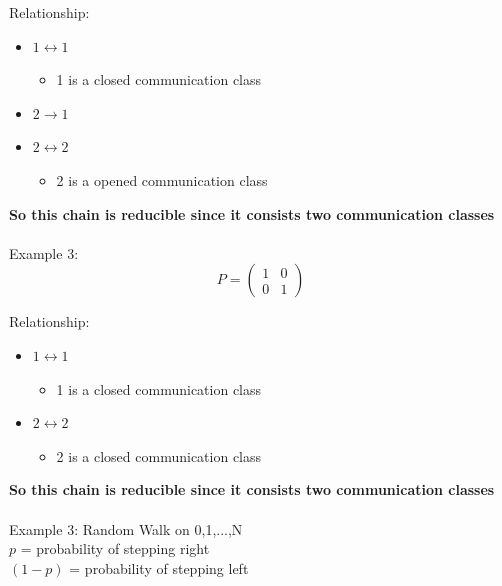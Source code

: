 \documentclass[12pt]{article}
\begin{document}
Relationship:\\
\begin{itemize}
    \item $1 \leftrightarrow1$
        \begin{itemize}
            \item {1} is a closed communication class
        \end{itemize}
    \item $2 \xrightarrow{}1$ 
    \item $2 \leftrightarrow 2$
        \begin{itemize}
            \item {2} is a opened communication class
        \end{itemize}
\end{itemize}
\textbf{So this chain is reducible since it consists two communication classes}\\\\
Example 3:
\[
P = \begin{pmatrix}
1 & 0 \\
0 & 1
\end{pmatrix}
\]
\begin{center}
\end{center}
Relationship:\\
\begin{itemize}
    \item $1 \leftrightarrow1$
        \begin{itemize}
            \item {1} is a closed communication class
        \end{itemize}
    \item $2 \leftrightarrow2$
        \begin{itemize}
            \item {2} is a closed communication class
        \end{itemize}
\end{itemize}
\textbf{So this chain is reducible since it consists two communication classes}\\\\
Example 3: Random Walk on {0,1,...,N}\\
$p$ = probability of stepping right\\
$(1-p)$ = probability of stepping left
\end{document}

